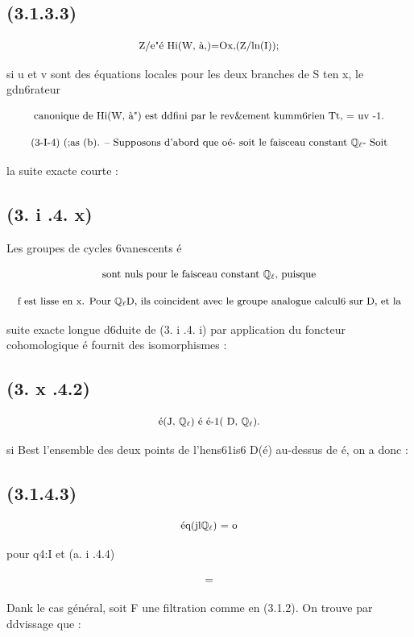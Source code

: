 \documentclass[11pt]{article}
\theoremstyle{remark}
\begin{document}
\subsection*{(3.1.3.3)}

\[\text{\small Z/e"é Hi(W, à,)=Ox,(Z/ln(I));}\]

si u et v sont des équations locales pour les deux branches de S ten x, le gdn6rateur

\[\text{\small canonique de Hi(W, à") est ddfini par le rev\&ement kumm6rien Tt, = uv -1.}\]

\[\text{\small (3-I-4) (;as (b). -- Supposons d'abord que oé- soit le faisceau constant \(\mathbb{Q}_{\ell}\)- Soit}\]

la suite exacte courte :

\subsection*{(3. i .4. x)}

Les groupes de cycles 6vanescents é

\[\text{\small sont nuls pour le faisceau constant \(\mathbb{Q}_{\ell}\), puisque}\]

\[\text{\small f est lisse en x. Pour \(\mathbb{Q}_{\ell}\)D, ils coincident avec le groupe analogue calcul6 sur D, et la}\]

suite exacte longue d6duite de (3. i .4. i) par application du foncteur cohomologique é fournit des isomorphismes :

\subsection*{(3. x .4.2)}

\[\text{\small é(J, \(\mathbb{Q}_{\ell}\)) é é-1( D, \(\mathbb{Q}_{\ell}\)).}\]

si Best l'ensemble des deux points de l'hens61is6 D(é) au-dessus de é, on a donc :

\subsection*{(3.1.4.3)}

\[\text{\small éq(jl\(\mathbb{Q}_{\ell}\)) = o}\]

pour q4:I et (a. i .4.4)

\[\text{\small =}\]

Dank le cas général, soit F une filtration comme en (3.1.2). On trouve par ddvissage que :
\end{document}
